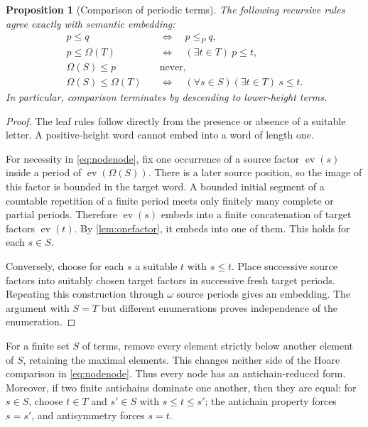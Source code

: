 \documentclass[11pt,letterpaper]{article}
\newtheorem{proposition}[proposition]{Proposition}
\theoremstyle{definition}
\theoremstyle{remark}
\newcommand{\ev}{\operatorname{ev}}
\begin{document}
\begin{proposition}[Comparison of periodic terms]\label{prop:comparison}
The following recursive rules agree exactly with semantic embedding:
\begin{align}
  p\le q &\quad\Longleftrightarrow\quad p\le_P q,
       \label{eq:leafleaf}\\
  p\le\Omega(T) &\quad\Longleftrightarrow\quad
       (\exists t\in T)\ p\le t,
       \label{eq:leafnode}\\
  \Omega(S)\le p &\quad\text{never},
       \label{eq:nodeleaf}\\
  \Omega(S)\le\Omega(T) &\quad\Longleftrightarrow\quad
       (\forall s\in S)(\exists t\in T)\ s\le t.
       \label{eq:nodenode}
\end{align}
In particular, comparison terminates by descending to lower-height terms.
\end{proposition}

\begin{proof}
The leaf rules follow directly from the presence or absence of a suitable
letter. A positive-height word cannot embed into a word of length one.

For necessity in \eqref{eq:nodenode}, fix one occurrence of a source factor
$\ev(s)$ inside a period of $\ev(\Omega(S))$. There is a later source
position, so the image of this factor is bounded in the target word.
A bounded initial segment of a countable repetition of a finite period
meets only finitely many complete or partial periods. Therefore
$\ev(s)$ embeds into a finite concatenation of target factors $\ev(t)$.
By \cref{lem:onefactor}, it embeds into one of them. This holds for each
$s\in S$.

Conversely, choose for each $s$ a suitable $t$ with $s\le t$.
Place successive source factors into suitably chosen target factors in
successive fresh target periods. Repeating this construction through
$\omega$ source periods gives an embedding. The argument with $S=T$
but different enumerations proves independence of the enumeration.
\end{proof}

For a finite set $S$ of terms, remove every element strictly below another
element of $S$, retaining the maximal elements. This changes neither side
of the Hoare comparison in \eqref{eq:nodenode}. Thus every node has an
antichain-reduced form. Moreover, if two finite antichains dominate one
another, then they are equal: for $s\in S$, choose $t\in T$ and $s'\in S$
with $s\le t\le s'$; the antichain property forces $s=s'$, and
antisymmetry forces $s=t$.
\end{document}
